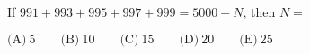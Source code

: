 

If $991+993+995+997+999=5000-N$, then $N=$

$\text{(A)}\ 5 \qquad \text{(B)}\ 10 \qquad \text{(C)}\ 15 \qquad \text{(D)}\ 20 \qquad \text{(E)}\ 25$
